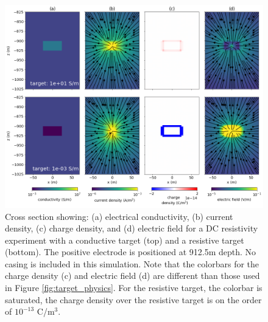 \begin{figure}
    \begin{center}
    \includegraphics[width=\textwidth]{figures/uncased_target_physics.png}
    \end{center}
\caption{
    Cross section showing: (a) electrical conductivity, (b) current density, (c) charge density, and
    (d) electric field for a DC resistivity experiment with a conductive target (top) and a resistive target
    (bottom). The positive electrode is positioned at 912.5m depth.
    No casing is included in this simulation. Note that the colorbars for the charge density (c) and electric field (d)
    are different than those used in Figure \ref{fig:target_physics}. For the resistive target, the colorbar is saturated,
    the charge density over the resistive target is on the order of $10^{-13}$ C/m$^3$.
}
\label{fig:uncased_target_physics}
\end{figure}
